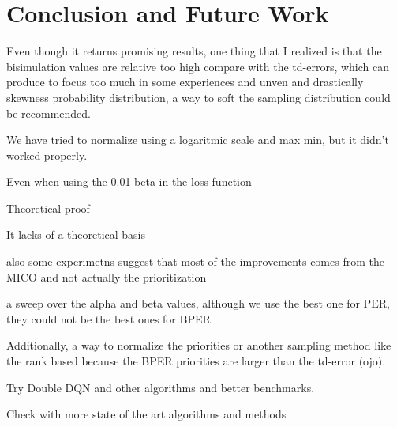 
\chapter{Conclusion and Future Work}

Even though it returns promising results, one thing that I realized is that the bisimulation values are relative too high compare with the td-errors, which can produce to focus too much in some experiences and unven and drastically skewness probability distribution, a way to soft the sampling distribution could be recommended. 

We have tried to normalize using a logaritmic scale and max min, but it didn't worked properly.

Even when using the 0.01 beta in the loss function

Theoretical proof

It lacks of a theoretical basis

also some experimetns suggest that most of the improvements comes from the MICO and not actually the prioritization

a sweep over the alpha and beta values, although we use the best one for PER, they could not be the best ones for BPER

Additionally, a way to normalize the priorities or another sampling method like the rank based because the BPER priorities are larger than the td-error (ojo).

Try Double DQN and other algorithms and better benchmarks.

Check with more state of the art algorithms and methods







